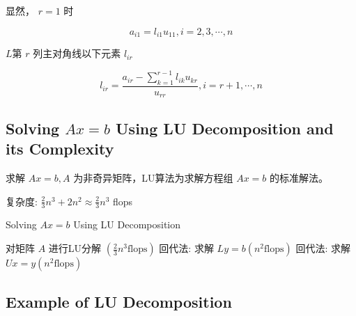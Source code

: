 \begin{corollary}
    显然， $ r=1 $ 时

    \begin{equation} a_{i 1}=l_{i 1} u_{11} , i=2,3, \cdots, n \end{equation}
\end{corollary}

\begin{corollary}
    $L$第 $ r $ 列主对角线以下元素 $ l_{i r} $

    \begin{equation} l_{i r}=\frac{a_{i r}-\sum_{k=1}^{r-1} l_{i k} u_{k r}}{u_{r r}}, i = r + 1, \cdots, n \end{equation}
\end{corollary}






\subsection{Solving $Ax = b$ Using LU Decomposition and its Complexity}
\label{Ax-eqs-b-LU}

求解 $ A x=b, A $ 为非奇异矩阵，LU算法为求解方程组 $ A x=b $ 的标准解法。

复杂度: $ \frac{2}{3} n^{3}+2 n^{2} \approx \frac{2}{3} n^{3} $ flops

\begin{algorithm}[htbp]
    \caption{Solving $Ax = b$ Using LU Decomposition}
    对矩阵 $ A $ 进行LU分解 $ \left(\frac{2}{3} n^{3} \text{flops} \right) $\;
    回代法: 求解 $ L y=b\left(n^{2}\text{flops} \right) $\;
    回代法: 求解 $ U x=y\left(n^{2}\text{flops} \right) $\;
\end{algorithm}


\subsection{Example of LU Decomposition}

